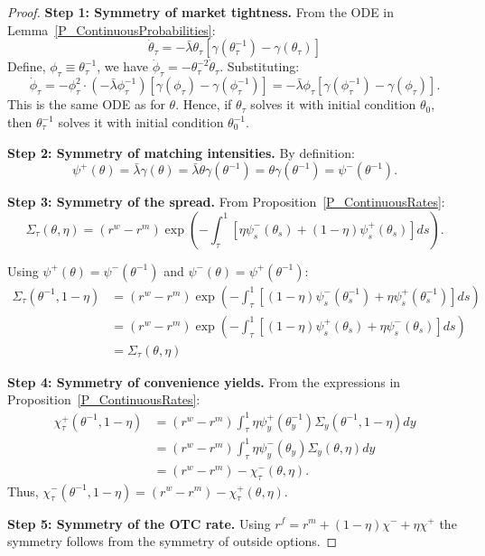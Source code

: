 \begin{proof}
\textbf{Step 1: Symmetry of market tightness.} From the ODE in Lemma~\ref{P_ContinuousProbabilities}:
\[
\dot{\theta}_{\tau} = -\bar{\lambda}\theta_{\tau}[\gamma(\theta_{\tau}^{-1}) - \gamma(\theta_{\tau})]
\]
Define, $\phi_{\tau} \equiv \theta_{\tau}^{-1}$, we have $\dot{\phi}_{\tau} = -\theta_{\tau}^{-2}\dot{\theta}_{\tau}$. Substituting:
\[
\dot{\phi}_{\tau} = -\phi_{\tau}^{2} \cdot (-\bar{\lambda}\phi_{\tau}^{-1})[\gamma(\phi_{\tau}) - \gamma(\phi_{\tau}^{-1})] = -\bar{\lambda}\phi_{\tau}[\gamma(\phi_{\tau}^{-1}) - \gamma(\phi_{\tau})].
\]
This is the same ODE as for $\theta$. Hence, if $\theta_\tau$ solves it with initial condition $\theta_0$, then $\theta_\tau^{-1}$ solves it with initial condition $\theta_0^{-1}$.

\textbf{Step 2: Symmetry of matching intensities.} By definition:
\[
\psi^{+}(\theta) = \bar{\lambda}\gamma(\theta) = \bar{\lambda}\theta\gamma(\theta^{-1}) = \theta\gamma(\theta^{-1}) = \psi^{-}(\theta^{-1}).
\]

\textbf{Step 3: Symmetry of the spread.} From Proposition~\ref{P_ContinuousRates}:
\[
\Sigma_{\tau}(\theta, \eta) = (r^{w} - r^{m})\exp\left(-\int_{\tau}^{1}[\eta\psi_{s}^{-}(\theta_s) + (1-\eta)\psi_{s}^{+}(\theta_s)]ds\right).
\]

Using $\psi^{+}(\theta) = \psi^{-}(\theta^{-1})$ and $\psi^{-}(\theta) = \psi^{+}(\theta^{-1})$:
\begin{align}
\Sigma_{\tau}(\theta^{-1}, 1-\eta) &= (r^{w} - r^{m})\exp\left(-\int_{\tau}^{1}[(1-\eta)\psi_{s}^{-}(\theta_s^{-1}) + \eta\psi_{s}^{+}(\theta_s^{-1})]ds\right)\\
&= (r^{w} - r^{m})\exp\left(-\int_{\tau}^{1}[(1-\eta)\psi_{s}^{+}(\theta_s) + \eta\psi_{s}^{-}(\theta_s)]ds\right)\\
&= \Sigma_{\tau}(\theta, \eta)
\end{align}

\textbf{Step 4: Symmetry of convenience yields.} From the expressions in Proposition~\ref{P_ContinuousRates}:
\begin{align*}
\chi_{\tau}^{+}(\theta^{-1}, 1-\eta) &= (r^{w} - r^{m})\int_{\tau}^{1}\eta\psi_{y}^{+}(\theta_y^{-1})\Sigma_{y}(\theta^{-1}, 1-\eta)dy\\
&= (r^{w} - r^{m})\int_{\tau}^{1}\eta\psi_{y}^{-}(\theta_y)\Sigma_{y}(\theta, \eta)dy\\
&= (r^{w} - r^{m}) - \chi_{\tau}^{-}(\theta, \eta).
\end{align*}
Thus, $\chi_{\tau}^{-}(\theta^{-1}, 1-\eta) = (r^{w} - r^{m}) - \chi_{\tau}^{+}(\theta, \eta)$.

\textbf{Step 5: Symmetry of the OTC rate.} Using $r^{f} = r^{m} + (1-\eta)\chi^{-} + \eta\chi^{+}$ the symmetry follows from the symmetry of outside options.
\end{proof}